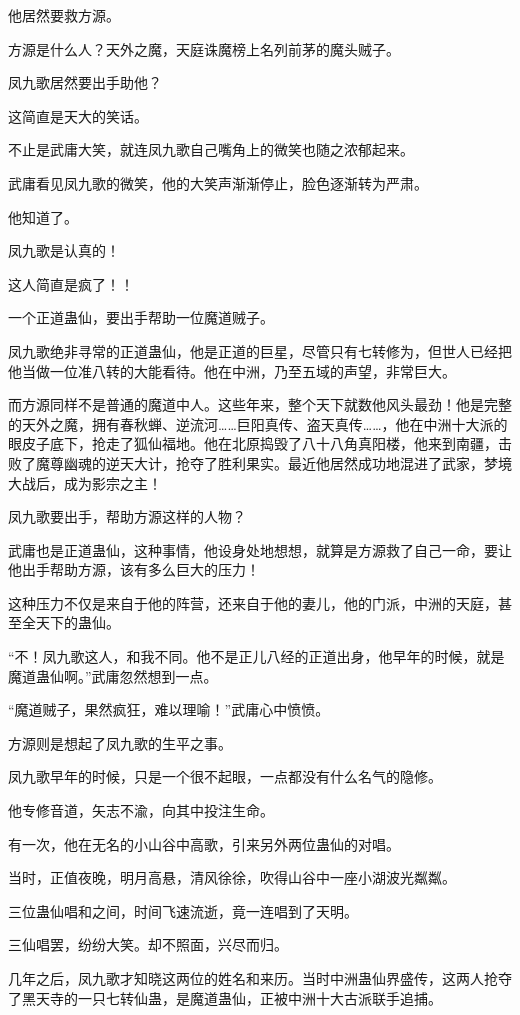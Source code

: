 \begin{this_body}
他居然要救方源。

方源是什么人？天外之魔，天庭诛魔榜上名列前茅的魔头贼子。

凤九歌居然要出手助他？

这简直是天大的笑话。

不止是武庸大笑，就连凤九歌自己嘴角上的微笑也随之浓郁起来。

武庸看见凤九歌的微笑，他的大笑声渐渐停止，脸色逐渐转为严肃。

他知道了。

凤九歌是认真的！

这人简直是疯了！！

一个正道蛊仙，要出手帮助一位魔道贼子。

凤九歌绝非寻常的正道蛊仙，他是正道的巨星，尽管只有七转修为，但世人已经把他当做一位准八转的大能看待。他在中洲，乃至五域的声望，非常巨大。

而方源同样不是普通的魔道中人。这些年来，整个天下就数他风头最劲！他是完整的天外之魔，拥有春秋蝉、逆流河……巨阳真传、盗天真传……，他在中洲十大派的眼皮子底下，抢走了狐仙福地。他在北原捣毁了八十八角真阳楼，他来到南疆，击败了魔尊幽魂的逆天大计，抢夺了胜利果实。最近他居然成功地混进了武家，梦境大战后，成为影宗之主！

凤九歌要出手，帮助方源这样的人物？

武庸也是正道蛊仙，这种事情，他设身处地想想，就算是方源救了自己一命，要让他出手帮助方源，该有多么巨大的压力！

这种压力不仅是来自于他的阵营，还来自于他的妻儿，他的门派，中洲的天庭，甚至全天下的蛊仙。

“不！凤九歌这人，和我不同。他不是正儿八经的正道出身，他早年的时候，就是魔道蛊仙啊。”武庸忽然想到一点。

“魔道贼子，果然疯狂，难以理喻！”武庸心中愤愤。

方源则是想起了凤九歌的生平之事。

凤九歌早年的时候，只是一个很不起眼，一点都没有什么名气的隐修。

他专修音道，矢志不渝，向其中投注生命。

有一次，他在无名的小山谷中高歌，引来另外两位蛊仙的对唱。

当时，正值夜晚，明月高悬，清风徐徐，吹得山谷中一座小湖波光粼粼。

三位蛊仙唱和之间，时间飞速流逝，竟一连唱到了天明。

三仙唱罢，纷纷大笑。却不照面，兴尽而归。

几年之后，凤九歌才知晓这两位的姓名和来历。当时中洲蛊仙界盛传，这两人抢夺了黑天寺的一只七转仙蛊，是魔道蛊仙，正被中洲十大古派联手追捕。


\end{this_body}
